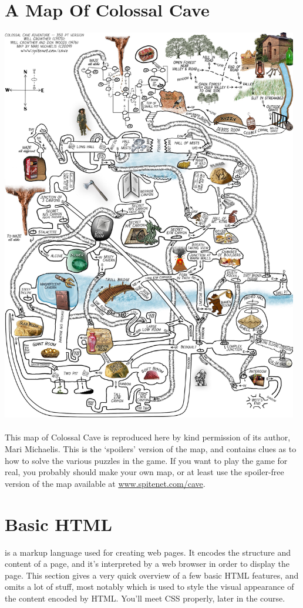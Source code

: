 \section{A Map Of Colossal Cave}
\label{appendix:colossal-map}
\includegraphics[width=13cm]{images/ColossalCaveAdventureMap}\\
\\
This map of Colossal Cave is reproduced here by kind permission of its author, Mari Michaelis. This is the `spoilers' version of the map, and contains clues as to how to solve the various puzzles in the game. If you want to play the game for real, you probably should make your own map, or at least use the spoiler-free version of the map available at \url{www.spitenet.com/cave}.

\section{Basic HTML}
\label{appendix:simplehtml}

 is a markup language used for creating web pages. It
encodes the structure and content of a page, and it's interpreted by a
web browser in order to display the page. This section gives a very
quick overview of a few basic HTML features, and omits a lot of stuff,
most notably  which is used to style the visual
appearance of the content encoded by HTML. You'll meet CSS properly,
later in the course.

